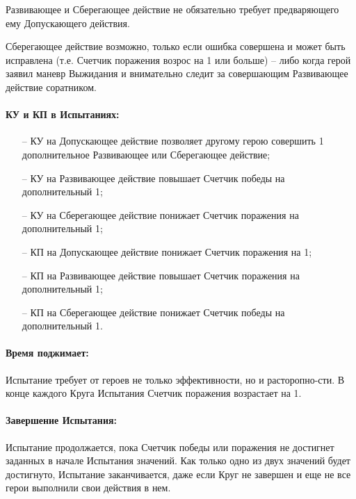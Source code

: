 \begin{itemize}
\begin{tcolorbox}
    Развивающее и Сберегающее действие не обязательно требует предваряющего ему Допускающего действия.\tbd
\end{tcolorbox}
\begin{tcolorbox}
Сберегающее действие возможно, только если ошибка совершена и может быть исправлена (т.е. Счетчик поражения возрос на 1 или больше) – либо когда герой заявил маневр Выжидания и внимательно следит за совершающим Развивающее действие соратником.
\end{tcolorbox}
\end{itemize}

\paragraph{КУ и КП в Испытаниях:}
\begin{itemize}
    \item[--] КУ на Допускающее действие позволяет другому герою совершить 1 дополнительное Развивающее или Сберегающее действие;
    \item[--] КУ на Развивающее действие повышает Счетчик победы на дополнительный 1;
    \item[--] КУ на Сберегающее действие понижает Счетчик поражения на дополнительный 1;
    \item[--] КП на Допускающее действие понижает Счетчик поражения на 1;
    \item[--] КП на Развивающее действие повышает Счетчик поражения на дополнительный 1;
    \item[--] КП на Сберегающее действие понижает Счетчик победы на дополнительный 1.
\end{itemize}

\paragraph{Время поджимает:} Испытание требует от героев не только эффективности, но и расторопно-сти. В конце каждого Круга Испытания Счетчик поражения возрастает на 1.
\paragraph{Завершение Испытания:} Испытание продолжается, пока Счетчик победы или поражения не достигнет заданных в начале Испытания значений. Как только одно из двух значений будет достигнуто, Испытание заканчивается, даже если Круг не завершен и еще не все герои выполнили свои действия в нем.
